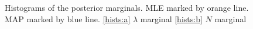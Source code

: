 \documentclass{ieeeaccess}
\theoremstyle{definition}
\begin{document}
\begin{figure}[H]
  \centering
  
  \caption{Histograms of the posterior marginals. MLE marked by orange line. MAP marked by blue line. \ref{hists:a} $\lambda$ marginal \ref{hists:b} $N$ marginal}
  \label{fig:hists}
\end{figure}
\end{document}
